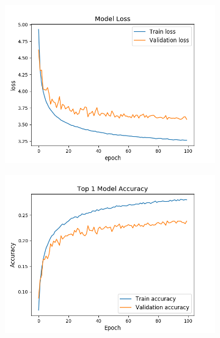 \begin{figure}[!h]
        \centering
        \begin{subfigure}[b]{0.32\textwidth}
            \centering
            \includegraphics[width=\textwidth]{../images/adam_final_no_fc_100batch_loss.png}
            \caption[]%
            {{\small }}
        \end{subfigure}
        \hfill
        \begin{subfigure}[b]{0.32\textwidth}
            \centering
            \includegraphics[width=\textwidth]{../images/adam_final_no_fc_100batch_top1.png}
            \caption[]%
            {{\small }}
        \end{subfigure}
        \hfill
        \begin{subfigure}[b]{0.32\textwidth}

\end{subfigure}
\end{figure}
